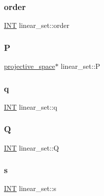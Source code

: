 \mbox{\label{classlinear__set_aadabf8bdec2252414868104bae308a72}} 
\subsubsection{\texorpdfstring{order}{order}}
{\footnotesize\ttfamily \mbox{\hyperlink{galois_8h_a09fddde158a3a20bd2dcadb609de11dc}{I\+NT}} linear\+\_\+set\+::order}

\mbox{\label{classlinear__set_a1de6f5ab3d701bd729c2da95f630884c}} 
\subsubsection{\texorpdfstring{P}{P}}
{\footnotesize\ttfamily \mbox{\hyperlink{classprojective__space}{projective\+\_\+space}}$\ast$ linear\+\_\+set\+::P}

\mbox{\label{classlinear__set_a008a519d19ff8418e62c906f3fce1d42}} 
\subsubsection{\texorpdfstring{q}{q}}
{\footnotesize\ttfamily \mbox{\hyperlink{galois_8h_a09fddde158a3a20bd2dcadb609de11dc}{I\+NT}} linear\+\_\+set\+::q}

\mbox{\label{classlinear__set_ab293d32594db88ecad92d41d89ea83d2}} 
\subsubsection{\texorpdfstring{Q}{Q}}
{\footnotesize\ttfamily \mbox{\hyperlink{galois_8h_a09fddde158a3a20bd2dcadb609de11dc}{I\+NT}} linear\+\_\+set\+::Q}

\mbox{\label{classlinear__set_ad4d01b16d3679869de7a1bb98f850cd2}} 
\subsubsection{\texorpdfstring{s}{s}}
{\footnotesize\ttfamily \mbox{\hyperlink{galois_8h_a09fddde158a3a20bd2dcadb609de11dc}{I\+NT}} linear\+\_\+set\+::s}

